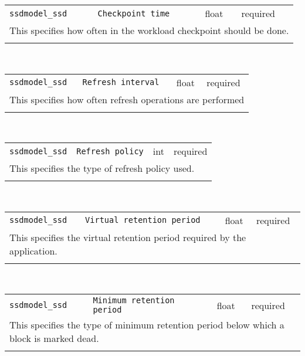 \noindent 
\begin{tabular}{|p{\lpmodwidth}|p{\lpnamewidth}|p{0.5in}|p{0.5in}|}
\cline{1-4}
\texttt{ssdmodel\_ssd} & \texttt{Checkpoint time} & float & required \\ 
\cline{1-4}
\multicolumn{4}{|p{6in}|}{
This specifies how often in the workload checkpoint should be done.
}\\ 
\cline{1-4}
\multicolumn{4}{p{5in}}{}\\
\end{tabular}\\ 
\noindent 
\begin{tabular}{|p{\lpmodwidth}|p{\lpnamewidth}|p{0.5in}|p{0.5in}|}
\cline{1-4}
\texttt{ssdmodel\_ssd} & \texttt{Refresh interval} & float & required \\ 
\cline{1-4}
\multicolumn{4}{|p{6in}|}{
This specifies how often refresh operations are performed
}\\ 
\cline{1-4}
\multicolumn{4}{p{5in}}{}\\
\end{tabular}\\ 
\noindent 
\begin{tabular}{|p{\lpmodwidth}|p{\lpnamewidth}|p{0.5in}|p{0.5in}|}
\cline{1-4}
\texttt{ssdmodel\_ssd} & \texttt{Refresh policy} & int & required \\ 
\cline{1-4}
\multicolumn{4}{|p{6in}|}{
This specifies the type of refresh policy used.
}\\ 
\cline{1-4}
\multicolumn{4}{p{5in}}{}\\
\end{tabular}\\ 
\noindent 
\begin{tabular}{|p{\lpmodwidth}|p{\lpnamewidth}|p{0.5in}|p{0.5in}|}
\cline{1-4}
\texttt{ssdmodel\_ssd} & \texttt{Virtual retention period} & float & required \\ 
\cline{1-4}
\multicolumn{4}{|p{6in}|}{
This specifies the virtual retention period required by the application.
}\\ 
\cline{1-4}
\multicolumn{4}{p{5in}}{}\\
\end{tabular}\\ 
\noindent 
\begin{tabular}{|p{\lpmodwidth}|p{\lpnamewidth}|p{0.5in}|p{0.5in}|}
\cline{1-4}
\texttt{ssdmodel\_ssd} & \texttt{Minimum retention period} & float & required \\ 
\cline{1-4}
\multicolumn{4}{|p{6in}|}{
This specifies the type of minimum retention period below which a block is marked dead.
}\\ 
\cline{1-4}
\multicolumn{4}{p{5in}}{}\\
\end{tabular}\\ 
